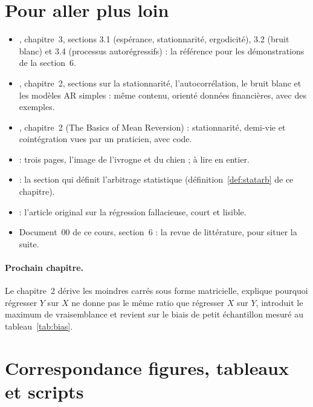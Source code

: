 \documentclass[11pt,a4paper]{article}
\begin{document}
\section{Pour aller plus loin}

\begin{toread}
\begin{itemize}[leftmargin=1.2em]
\item \citet{hamilton1994}, chapitre~3, sections 3.1 (espérance, stationnarité, ergodicité), 3.2 (bruit blanc) et 3.4 (processus autorégressifs) : la référence pour les démonstrations de la section~6.
\item \citet{tsay2010}, chapitre~2, sections sur la stationnarité, l'autocorrélation, le bruit blanc et les modèles AR simples : même contenu, orienté données financières, avec des exemples.
\item \citet{chan2013}, chapitre~2 (\og The Basics of Mean Reversion\fg) : stationnarité, demi-vie et cointégration vues par un praticien, avec code.
\item \citet{murray1994} : trois pages, l'image de l'ivrogne et du chien ; à lire en entier.
\item \citet{hogan2004} : la section qui définit l'arbitrage statistique (définition~\ref{def:statarb} de ce chapitre).
\item \citet{granger1974} : l'article original sur la régression fallacieuse, court et lisible.
\item Document~00 de ce cours, section~6 : la revue de littérature, pour situer la suite.
\end{itemize}
\end{toread}

\paragraph{Prochain chapitre.} Le chapitre~2 dérive les moindres carrés sous forme matricielle, explique pourquoi régresser $Y$ sur $X$ ne donne pas le même ratio que régresser $X$ sur $Y$, introduit le maximum de vraisemblance et revient sur le biais de petit échantillon mesuré au tableau~\ref{tab:bias}.

\appendix
\section{Correspondance figures, tableaux et scripts}
\end{document}
